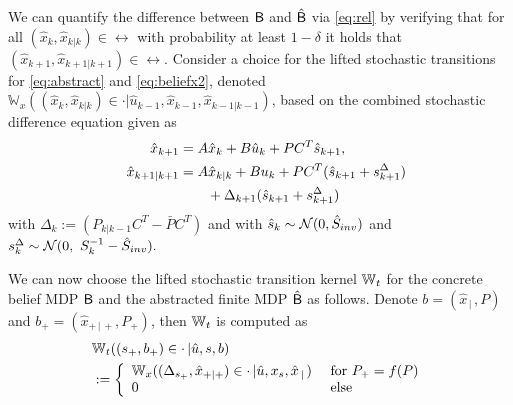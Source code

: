 \documentclass{ifacconf}
\begin{document}
We can quantify the difference between $\mathsf{B}$ and $\hat{\mathsf{B}}$ via \eqref{eq:rel} by verifying that for all  $(\hat x_k,\hat x_{k|k})\in \rel$ with probability at least $1-\delta$ it holds that $(\hat x_{k+1},\hat x_{k+1|k+1})\in \rel$. 
Consider a choice for the lifted stochastic  transitions  for \eqref{eq:abstract} and \eqref{eq:beliefx2},  denoted 
	$ \mathbb W_{x}((\hat x_k, \hat x_{k|k})\in \cdot| \hat u_{k-1}, \hat x_{k-1}, \hat x_{k-1|k-1})$, based on the combined stochastic difference equation given as
\begin{align*}
		&&\hat x_{k+1} &=A\hat x_{k} +B\hat u_{k} + \bar P  C^T  \hat{s}_{k+1},\\%
	&&\hat x_{k+1|k+1}&=A\hat x_{k|k}+Bu_{k}+  \bar P   C^T(  \hat{s}_{k+1}+s^\Delta_{k+1})\notag\\&&&\qquad+\Delta_{k+1}( \hat{s}_{k+1}+ s^\Delta_{k+1})%
\end{align*}
 with $\Delta_k:=(P_{k|k-1}C^T-  \bar P   C^T)$ and with $ \hat{s}_k\sim \mathcal{N} (0,\hat{S}_{inv})$ and $ s^\Delta_k\sim  \mathcal{N} (0,\  S_k^{-1}-\hat{S}_{inv}). $

We can now choose the lifted stochastic transition kernel 	$\mathbb{W}_{t}$ for the concrete belief MDP $\mathsf{B}$ and the abstracted finite MDP $\hat{\mathsf{B}}$ as follows.
Denote $b=(\hat x_{\,|\,}, P)$ and $b_+=(\hat x_{+\,|\,+}, P_+)$, then 	$\mathbb{W}_{t}$ is computed as 
 \begin{align*}
 &	\mathbb{W}_{t}((s_+,b_+)\in \cdot\,| \hat u, s ,b)\\&:= \left\{\begin{array}{ll} \mathbb W_{x}((\Delta_{s_+}, \hat x_{+|+})\in \cdot\,|  \hat u,x_s , \hat x_{\,|\,}) &\text{ for }  P_+=f(P)\\
 	0 & \text{ else } \end{array}\right.
 \end{align*}
\end{document}
